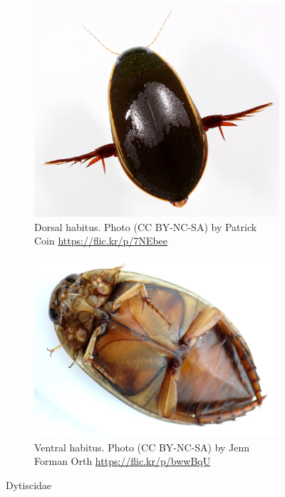 \documentclass[letterpaper, 11pt]{article}
\begin{document}
\begin{figure}[ht!]
  \centering
\begin{subfigure}[ht!]{0.35\textwidth}
    \includegraphics[width=\textwidth]{DytiscidHabitus1}
  \caption{Dorsal habitus. Photo (CC BY-NC-SA) by Patrick Coin \url{https://flic.kr/p/7NEbee}}
  \label{fig:dytiscidHabitus1}
\end{subfigure}
    \qquad
\begin{subfigure}[ht!]{0.4\textwidth}
    \includegraphics[width=\textwidth]{DytiscidHabitus2}
  \caption{Ventral habitus. Photo (CC BY-NC-SA) by Jenn Forman Orth \url{https://flic.kr/p/bwwBqU}}
  \label{fig:dytiscidHabitus2}
\end{subfigure}
    \caption{Dytiscidae}\label{fig:dytiscids}
\end{figure}
\end{document}
